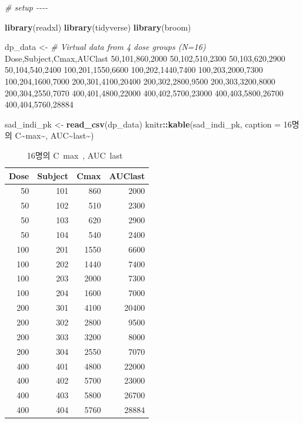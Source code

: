 \documentclass[
  10pt,
]{krantz}
\makeatletter
\newenvironment{Shaded}{\begin{snugshade}}{\end{snugshade}}
\newcommand{\CommentTok}[1]{\textcolor[rgb]{0.56,0.35,0.01}{\textit{#1}}}
\newcommand{\DataTypeTok}[1]{\textcolor[rgb]{0.13,0.29,0.53}{#1}}
\newcommand{\KeywordTok}[1]{\textcolor[rgb]{0.13,0.29,0.53}{\textbf{#1}}}
\newcommand{\NormalTok}[1]{#1}
\newcommand{\OperatorTok}[1]{\textcolor[rgb]{0.81,0.36,0.00}{\textbf{#1}}}
\newcommand{\StringTok}[1]{\textcolor[rgb]{0.31,0.60,0.02}{#1}}
\newenvironment{kframe}{%
\medskip{}
\setlength{\fboxsep}{.8em}
 \def\at@end@of@kframe{}%
 \ifinner\ifhmode%
  \def\at@end@of@kframe{\end{minipage}}%
  \begin{minipage}{\columnwidth}%
 \fi\fi%
 \def\FrameCommand##1{\hskip\@totalleftmargin \hskip-\fboxsep
 \colorbox{shadecolor}{##1}\hskip-\fboxsep
     \hskip-\linewidth \hskip-\@totalleftmargin \hskip\columnwidth}%
 \MakeFramed {\advance\hsize-\width
   \@totalleftmargin\z@ \linewidth\hsize
   \@setminipage}}%
 {\par\unskip\endMakeFramed%
 \at@end@of@kframe}
\renewenvironment{Shaded}{\begin{kframe}}{\end{kframe}}
\makeatother
\begin{document}
\begin{Shaded}
\begin{Highlighting}[]
\CommentTok{\# setup {-}{-}{-}{-}}

\KeywordTok{library}\NormalTok{(readxl)}
\KeywordTok{library}\NormalTok{(tidyverse)}
\KeywordTok{library}\NormalTok{(broom)}

\NormalTok{dp\_data \textless{}{-}}\StringTok{ }\CommentTok{\# Virtual data from 4 dose groups (N=16)}
\StringTok{\textquotesingle{}Dose,Subject,Cmax,AUClast}
\StringTok{50,101,860,2000}
\StringTok{50,102,510,2300}
\StringTok{50,103,620,2900}
\StringTok{50,104,540,2400}
\StringTok{100,201,1550,6600}
\StringTok{100,202,1440,7400}
\StringTok{100,203,2000,7300}
\StringTok{100,204,1600,7000}
\StringTok{200,301,4100,20400}
\StringTok{200,302,2800,9500}
\StringTok{200,303,3200,8000}
\StringTok{200,304,2550,7070}
\StringTok{400,401,4800,22000}
\StringTok{400,402,5700,23000}
\StringTok{400,403,5800,26700}
\StringTok{400,404,5760,28884\textquotesingle{}}

\NormalTok{sad\_indi\_pk \textless{}{-}}\StringTok{ }\KeywordTok{read\_csv}\NormalTok{(dp\_data)}
\NormalTok{knitr}\OperatorTok{::}\KeywordTok{kable}\NormalTok{(sad\_indi\_pk, }\DataTypeTok{caption =} \StringTok{\textquotesingle{}16명의 C\textasciitilde{}max\textasciitilde{}, AUC\textasciitilde{}last\textasciitilde{}\textquotesingle{}}\NormalTok{)}
\end{Highlighting}
\end{Shaded}

\begin{table}

\caption{\label{tab:sad-pk}16명의 C~max~, AUC~last~}
\centering
\begin{tabular}[t]{r|r|r|r}
\hline
Dose & Subject & Cmax & AUClast\\
\hline
50 & 101 & 860 & 2000\\
\hline
50 & 102 & 510 & 2300\\
\hline
50 & 103 & 620 & 2900\\
\hline
50 & 104 & 540 & 2400\\
\hline
100 & 201 & 1550 & 6600\\
\hline
100 & 202 & 1440 & 7400\\
\hline
100 & 203 & 2000 & 7300\\
\hline
100 & 204 & 1600 & 7000\\
\hline
200 & 301 & 4100 & 20400\\
\hline
200 & 302 & 2800 & 9500\\
\hline
200 & 303 & 3200 & 8000\\
\hline
200 & 304 & 2550 & 7070\\
\hline
400 & 401 & 4800 & 22000\\
\hline
400 & 402 & 5700 & 23000\\
\hline
400 & 403 & 5800 & 26700\\
\hline
400 & 404 & 5760 & 28884\\
\hline
\end{tabular}
\end{table}
\end{document}
